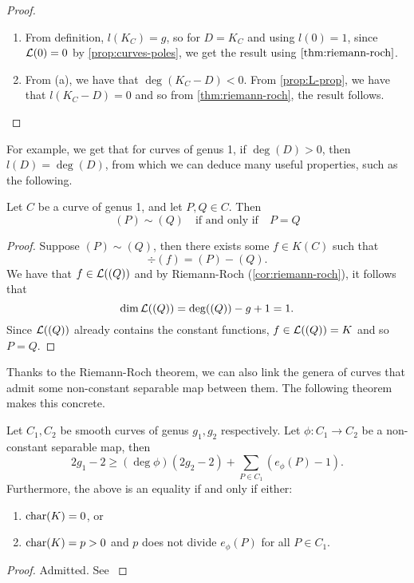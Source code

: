 \begin{proof}
	\begin{enumerate}[itemsep=0em, label=(\alph*)]
		\item From definition, $l(K_C) = g$, so for $D = K_C$ and using 
			$l(0) = 1$, since $\mathcal{L}(0) = 0$ by \ref{prop:curves-poles}, we get the
			result using $\ref{thm:riemann-roch}$.
		\item From (a), we have that $\deg(K_C - D) < 0$. From
			\ref{prop:L-prop}, we have that $l(K_C - D) = 0$ and so
			from \ref{thm:riemann-roch}, the result follows.
	\end{enumerate}
\end{proof}

For example, we get that for curves of genus 1, if $\deg(D) > 0$,
then $l(D) = \deg(D)$, from which we can deduce many useful properties, such
as the following.

\begin{proposition}
	\label{prop:sim-implies-eq}
	Let $C$ be a curve of genus 1, and let $P, Q \in C$. Then
	\begin{equation*}
		(P) \sim (Q)
		\quad\textrm{if and only if}\quad
		P = Q
	\end{equation*}
\end{proposition}

\begin{proof}
	Suppose $(P) \sim (Q)$, then there exists some $f \in K(C)$ such that
	\begin{equation*}
		\div(f) = (P) - (Q).
	\end{equation*}
	We have that $f \in \mathcal{L}((Q))$ and by Riemann-Roch (\ref{cor:riemann-roch}),
	it follows that
	\begin{equation*}
		\dim \mathcal{L}((Q)) = \deg((Q)) - g + 1 = 1.
	\end{equation*}
	Since $\mathcal{L}((Q))$ already contains the constant functions, $f \in \mathcal{L}((Q)) = K$
	and so $P = Q$.
\end{proof}

Thanks to the Riemann-Roch theorem, we can also link the genera of 
curves that admit some non-constant separable map between them.
The following theorem makes this concrete.
\begin{theorem}
	\label{thm:riemann-hurwitz}
	Let $C_1, C_2$ be smooth curves of genus $g_1, g_2$ respectively.
	Let $\phi: C_1 \to C_2$ be a non-constant separable map, then
	\begin{equation*}
		2g_1 - 2 \geq (\deg \phi) (2g_2 - 2) + \sum_{P \in C_1}(e_\phi(P) - 1).
	\end{equation*}
	Furthermore, the above is an equality if and only if either:
	\begin{enumerate}[itemsep=0em, label=(\roman*)]
		\item $\operatorname{char}(K) = 0$, or
		\item $\operatorname{char}(K) = p > 0$ and $p$ does not divide $e_\phi(P)$ for all
			$P \in C_1$.
	\end{enumerate}
\end{theorem}
\begin{proof}
	Admitted. See \cite[II.5.9]{silverman}
\end{proof}

